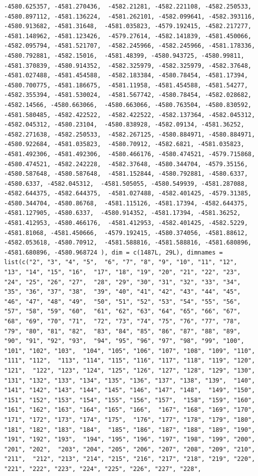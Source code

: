 \documentclass[
]{article}
\begin{document}
\begin{verbatim}
-4580.625357, -4581.270436,  -4582.21281, -4582.221108, -4582.250533, -4580.897112, -4581.136224,  -4581.262101, -4582.099641, -4582.393116, -4580.913682, -4581.31648,  -4581.035823, -4579.192415, -4582.217277, -4581.148962, -4581.123426,  -4579.27614, -4582.141839, -4581.450066, -4582.095794, -4581.521707,  -4582.245966, -4582.245966, -4581.178336, -4580.792881, -4582.15016,  -4581.48399, -4580.943725, -4580.99811, -4581.370839, -4580.914352,  -4582.325979, -4582.325979, -4582.37648, -4581.027488, -4581.454588,  -4582.183384, -4580.78454, -4581.17394, -4580.700775, -4581.186675,  -4581.11958, -4581.454588, -4581.54277, -4582.355394, -4581.530024,  -4581.567742, -4580.78454, -4582.028682, -4582.14566, -4580.663066,  -4580.663066, -4580.763504, -4580.830592, -4581.580485, -4582.422522,  -4582.422522, -4582.137364, -4582.045312, -4582.045312, -4580.23104,  -4580.838928, -4582.09134, -4581.36252, -4582.271638, -4582.250533,  -4582.267125, -4580.884971, -4580.884971, -4580.922684, -4581.035823,  -4580.70912, -4582.6821, -4581.035823, -4581.492306, -4581.492306,  -4580.466176, -4580.474521, -4579.715868, -4580.474521, -4582.242228,  -4582.37648, -4580.344704, -4579.35156, -4580.587648, -4580.587648,  -4581.152844, -4580.792881, -4580.6337, -4580.6337, -4582.045312,  -4581.505055, -4580.549939, -4581.287088, -4582.644375, -4582.644375,  -4581.027488, -4582.401425, -4579.31385, -4580.344704, -4580.86768,  -4581.115126, -4581.17394, -4582.644375, -4581.127905, -4580.6337,  -4580.914352, -4581.17394, -4581.36252, -4581.412953, -4580.466176,  -4581.412953, -4582.401425, -4582.5229, -4581.81068, -4581.450666,  -4579.192415, -4580.374056, -4581.88612, -4582.053618, -4580.70912,  -4581.588816, -4581.588816, -4581.680896, -4581.680896, -4580.968724 ), dim = c(1487L, 29L), dimnames = list(c("2", "3", "4", "5",  "6", "7", "8", "9", "10", "11", "12", "13", "14", "15", "16",  "17", "18", "19", "20", "21", "22", "23", "24", "25", "26", "27",  "28", "29", "30", "31", "32", "33", "34", "35", "36", "37", "38",  "39", "40", "41", "42", "43", "44", "45", "46", "47", "48", "49",  "50", "51", "52", "53", "54", "55", "56", "57", "58", "59", "60",  "61", "62", "63", "64", "65", "66", "67", "68", "69", "70", "71",  "72", "73", "74", "75", "76", "77", "78", "79", "80", "81", "82",  "83", "84", "85", "86", "87", "88", "89", "90", "91", "92", "93",  "94", "95", "96", "97", "98", "99", "100", "101", "102", "103",  "104", "105", "106", "107", "108", "109", "110", "111", "112",  "113", "114", "115", "116", "117", "118", "119", "120", "121",  "122", "123", "124", "125", "126", "127", "128", "129", "130",  "131", "132", "133", "134", "135", "136", "137", "138", "139",  "140", "141", "142", "143", "144", "145", "146", "147", "148",  "149", "150", "151", "152", "153", "154", "155", "156", "157",  "158", "159", "160", "161", "162", "163", "164", "165", "166",  "167", "168", "169", "170", "171", "172", "173", "174", "175",  "176", "177", "178", "179", "180", "181", "182", "183", "184",  "185", "186", "187", "188", "189", "190", "191", "192", "193",  "194", "195", "196", "197", "198", "199", "200", "201", "202",  "203", "204", "205", "206", "207", "208", "209", "210", "211",  "212", "213", "214", "215", "216", "217", "218", "219", "220",  "221", "222", "223", "224", "225", "226", "227", "228", 
\end{verbatim}
\end{document}
